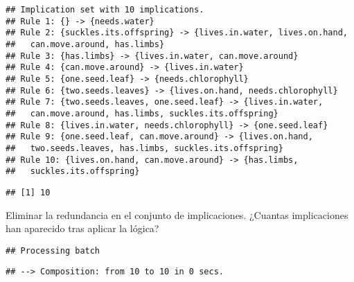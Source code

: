 \documentclass[
]{book}
\newenvironment{Shaded}{\begin{snugshade}}{\end{snugshade}}
\newcommand{\AttributeTok}[1]{\textcolor[rgb]{0.77,0.63,0.00}{#1}}
\newcommand{\FunctionTok}[1]{\textcolor[rgb]{0.00,0.00,0.00}{#1}}
\newcommand{\NormalTok}[1]{#1}
\newcommand{\SpecialCharTok}[1]{\textcolor[rgb]{0.00,0.00,0.00}{#1}}
\newcommand{\StringTok}[1]{\textcolor[rgb]{0.31,0.60,0.02}{#1}}
\begin{document}
\begin{verbatim}
## Implication set with 10 implications.
## Rule 1: {} -> {needs.water}
## Rule 2: {suckles.its.offspring} -> {lives.in.water, lives.on.hand,
##   can.move.around, has.limbs}
## Rule 3: {has.limbs} -> {lives.in.water, can.move.around}
## Rule 4: {can.move.around} -> {lives.in.water}
## Rule 5: {one.seed.leaf} -> {needs.chlorophyll}
## Rule 6: {two.seeds.leaves} -> {lives.on.hand, needs.chlorophyll}
## Rule 7: {two.seeds.leaves, one.seed.leaf} -> {lives.in.water,
##   can.move.around, has.limbs, suckles.its.offspring}
## Rule 8: {lives.in.water, needs.chlorophyll} -> {one.seed.leaf}
## Rule 9: {one.seed.leaf, can.move.around} -> {lives.on.hand,
##   two.seeds.leaves, has.limbs, suckles.its.offspring}
## Rule 10: {lives.on.hand, can.move.around} -> {has.limbs,
##   suckles.its.offspring}
\end{verbatim}

\begin{Shaded}
\end{Shaded}

\begin{verbatim}
## [1] 10
\end{verbatim}

Eliminar la redundancia en el conjunto de implicaciones. ¿Cuantas implicaciones han aparecido tras aplicar la lógica?

\begin{Shaded}
\end{Shaded}

\begin{verbatim}
## Processing batch
\end{verbatim}

\begin{verbatim}
## --> Composition: from 10 to 10 in 0 secs.
\end{verbatim}
\end{document}
